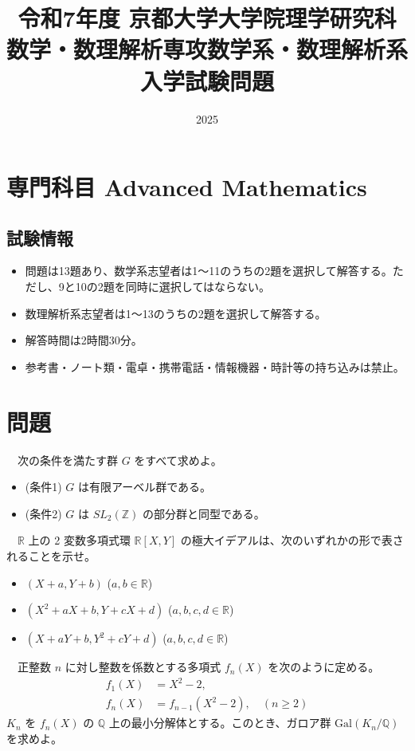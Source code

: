 \documentclass{article}
\begin{document}
\title{令和7年度 京都大学大学院理学研究科 数学・数理解析専攻\newline 数学系・数理解析系 入学試験問題}
\author{}
\date{2025}
\maketitle

\section*{専門科目 Advanced Mathematics}

\subsection*{試験情報}
\begin{itemize}
    \item 問題は13題あり、数学系志望者は1〜11のうちの2題を選択して解答する。ただし、9と10の2題を同時に選択してはならない。
    \item 数理解析系志望者は1〜13のうちの2題を選択して解答する。
    \item 解答時間は2時間30分。
    \item 参考書・ノート類・電卓・携帯電話・情報機器・時計等の持ち込みは禁止。
\end{itemize}

\section*{問題}
{\large {}}\ \ 次の条件を満たす群 $G$ をすべて求めよ。
\begin{itemize}
    \item (条件1) $G$ は有限アーベル群である。
    \item (条件2) $G$ は $SL_2(\mathbb{Z})$ の部分群と同型である。
\end{itemize}

\ \ $\mathbb{R}$ 上の 2 変数多項式環 $\mathbb{R}[X,Y]$ の極大イデアルは、次のいずれかの形で表されることを示せ。
\begin{itemize}
    \item $(X + a, Y + b)$ ($a, b \in \mathbb{R}$)
    \item $(X^2 + aX + b, Y + cX + d)$ ($a, b, c, d \in \mathbb{R}$)
    \item $(X + aY + b, Y^2 + cY + d)$ ($a, b, c, d \in \mathbb{R}$)
\end{itemize}

\ \ 正整数 $n$ に対し整数を係数とする多項式 $f_n(X)$ を次のように定める。
\begin{align*}
    f_1(X) &= X^2 - 2, \\
    f_n(X) &= f_{n-1}(X^2 - 2), \quad (n \geq 2)
\end{align*}
$K_n$ を $f_n(X)$ の $\mathbb{Q}$ 上の最小分解体とする。このとき、ガロア群 $\text{Gal}(K_n/\mathbb{Q})$ を求めよ。
\end{document}
